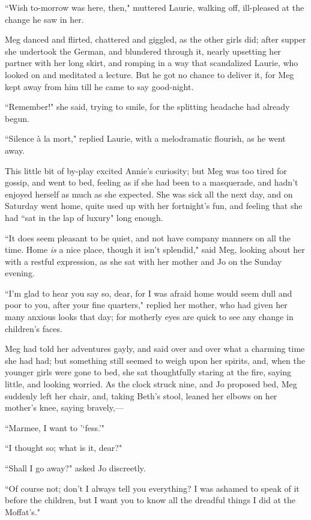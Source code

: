 ``Wish to-morrow was here, then," muttered Laurie, walking off,
ill-pleased at the change he saw in her.

Meg danced and flirted, chattered and giggled, as the other girls did;
after supper she undertook the German, and blundered through it, nearly
upsetting her partner with her long skirt, and romping in a way that
scandalized Laurie, who looked on and meditated a lecture. But he got no
chance to deliver it, for Meg kept away from him till he came to say
good-night.

``Remember!" she said, trying to smile, for the splitting headache had
already begun.

``Silence à la mort," replied Laurie, with a melodramatic flourish, as he
went away.

This little bit of by-play excited Annie's curiosity;
but Meg was too tired for gossip, and went to bed, feeling as if she had
been to a masquerade, and hadn't enjoyed herself as much
as she expected. She was sick all the next day, and on Saturday went
home, quite used up with her fortnight's fun, and
feeling that she had ``sat in the lap of luxury" long enough.

``It does seem pleasant to be quiet, and not have company manners on all
the time. Home \emph{is} a nice place, though it isn't
splendid," said Meg, looking about her with a restful expression, as she
sat with her mother and Jo on the Sunday evening.

``I'm glad to hear you say so, dear, for I was afraid
home would seem dull and poor to you, after your fine quarters," replied
her mother, who had given her many anxious looks that day; for motherly
eyes are quick to see any change in children's faces.

Meg had told her adventures gayly, and said over and over what a
charming time she had had; but something still seemed to weigh upon her
spirits, and, when the younger girls were gone to bed, she sat
thoughtfully staring at the fire, saying little, and looking worried. As
the clock struck nine, and Jo proposed bed, Meg suddenly left her chair,
and, taking Beth's stool, leaned her elbows on her
mother's knee, saying bravely,---

``Marmee, I want to
'`fess.'"

``I thought so; what is it, dear?"

``Shall I go away?" asked Jo discreetly.

``Of course not; don't I always tell you everything? I
was ashamed to speak of it before the children, but I want you to know
all the dreadful things I did at the Moffat's."

